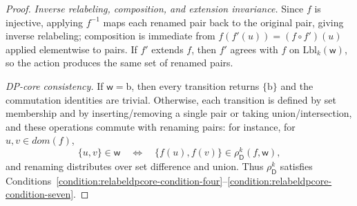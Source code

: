 \documentclass[11pt,a4paper]{article}
\newcommand{\treewidthvalue}{k}
\newcommand{\vertexone}{u}
\newcommand{\vertextwo}{v}
\newcommand{\awitness}{\mathsf{w}}
\newcommand{\dpcore}{\mathsf{D}}
\newcommand{\domain}{dom}
\newcommand{\multiedgefound}{\mathrm{b}}
\newcommand{\relabelingfunction}{f}
\newcommand{\action}{\rho}
\begin{document}
{\begin{proof}
	\smallskip\noindent
	\emph{Inverse relabeling, composition, and extension invariance.}
	Since $\relabelingfunction$ is injective, applying $\relabelingfunction^{-1}$ maps each renamed pair back to the original pair, giving inverse relabeling; composition is immediate from $\relabelingfunction(\relabelingfunction'(u))=(\relabelingfunction\circ\relabelingfunction')(u)$ applied elementwise to pairs.
	If $\relabelingfunction'$ extends $\relabelingfunction$, then $\relabelingfunction'$ agrees with $\relabelingfunction$ on $\mathrm{Lbl}_{\treewidthvalue}(\awitness)$, so the action produces the same set of renamed pairs.

	\smallskip\noindent
	\emph{DP-core consistency.}
	If $\awitness=\multiedgefound$, then every transition returns $\{\multiedgefound\}$ and the commutation identities are trivial.
	Otherwise, each transition is defined by set membership and by inserting/removing a single pair or taking union/intersection, and these operations commute with renaming pairs:
	for instance, for $\vertexone,\vertextwo\in \domain(\relabelingfunction)$,
	\[
	\{\vertexone,\vertextwo\}\in \awitness
	\quad\Longleftrightarrow\quad
	\{\relabelingfunction(\vertexone),\relabelingfunction(\vertextwo)\}\in \action_{\dpcore}^{\treewidthvalue}(\relabelingfunction,\awitness),
	\]
	and renaming distributes over set difference and union.
	Thus $\action_{\dpcore}^{\treewidthvalue}$ satisfies Conditions~\ref{condition:relabeldpcore-condition-four}--\ref{condition:relabeldpcore-condition-seven}.
	\end{proof}
}
\end{document}
